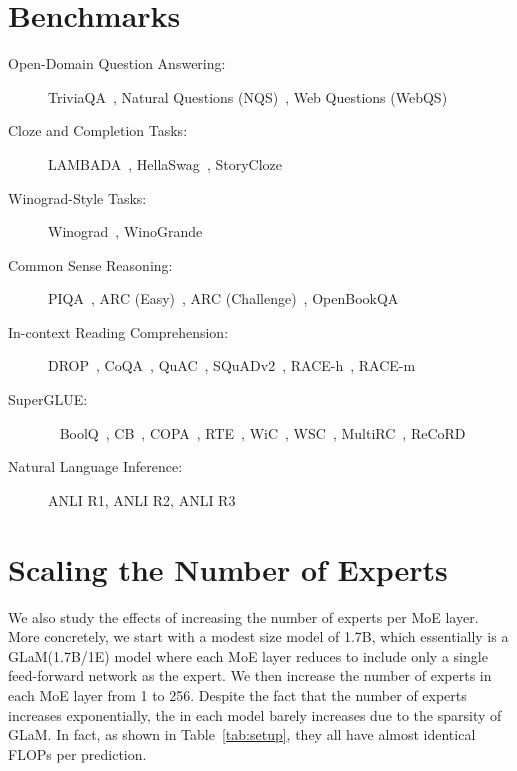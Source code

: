\documentclass{article}
\newcommand{\glam}{GLaM\xspace}
\begin{document}



\clearpage
\appendix

\section{Benchmarks}
\label{sec:benchmarks}

\begin{description}
    \item [Open-Domain Question Answering:] TriviaQA~\cite{JoshiTriviaQA2017}, Natural Questions (NQS)~\cite{nqs2019}, Web Questions (WebQS)~\cite{webqs2013}
    \item [Cloze and Completion Tasks:] LAMBADA~\cite{lambada2016}, HellaSwag~\cite{hellaswag2019}, StoryCloze~\cite{storycloze2016}
    \item [Winograd-Style Tasks:]
        Winograd~\cite{winograd2012}, WinoGrande~\cite{Winogrande2020}
    \item [Common Sense Reasoning:]
    PIQA~\cite{PIQA2020}, ARC (Easy)~\cite{allenai:arc}, ARC (Challenge)~\cite{allenai:arc}, OpenBookQA~\cite{OpenBookQA2018}
    \item [In-context Reading Comprehension:] DROP~\cite{DROP2019}, CoQA~\cite{COQA2019}, QuAC~\cite{QUAC2018}, SQuADv2~\cite{squad2018}, RACE-h~\cite{race2017}, RACE-m~\cite{race2017}
    \item [SuperGLUE:]~\cite{superglue2019} BoolQ~\cite{boolq2019}, CB~\cite{cb2019}, COPA~\cite{COPA2012}, RTE~\cite{rte2006}, WiC~\cite{wic2018}, WSC~\cite{winograd2012}, MultiRC~\cite{multirc2018}, ReCoRD~\cite{record2018}
    \item [Natural Language Inference:] ANLI R1, ANLI R2, ANLI R3~\cite{anli2000}
\end{description}







\section{Scaling the Number of Experts}
\label{sec:scaling_number_experts}
We also study the effects of increasing the number of experts per MoE layer. More concretely, we start with a modest size model of 1.7B, which essentially is a \glam (1.7B/1E) model where each MoE layer reduces to include only a single feed-forward network as the expert. We then increase the number of experts in each MoE layer from 1 to 256. Despite the fact that the number of experts increases exponentially, the  in each model barely increases due to the sparsity of \glam. In fact, as shown in Table~\ref{tab:setup}, they all have almost identical FLOPs per prediction.
\end{document}
